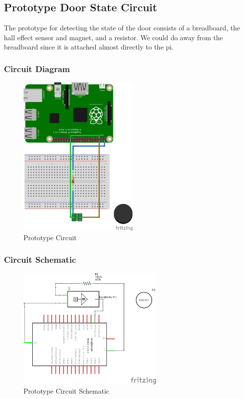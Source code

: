 \documentclass[10pt]{article}
\begin{document}
\subsection{Prototype Door State Circuit}

The prototype for detecting the state of the door consists of a breadboard, the hall effect sensor and magnet, and a resistor. We could do away from the breadboard since it is attached almost directly to the pi.

\subsubsection{Circuit Diagram}
\begin{figure}[h]
\centering
\caption{Prototype Circuit}
\label{Prototype Circuit}
\includegraphics[height=8cm]{images/hall_effect_diagram.png}
\end{figure}

\subsubsection{Circuit Schematic}
\begin{figure}[h]
\centering
\caption{Prototype Circuit Schematic}
\label{Prototype Circuit Schematic}
\includegraphics[height=6cm]{images/hall_effect_schem.png}
\end{figure}
\end{document}

